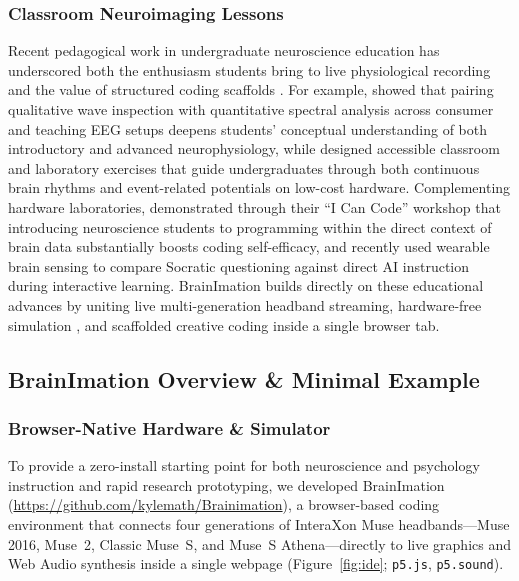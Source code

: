 \documentclass[11pt]{article}
\begin{document}
\subsubsection{Classroom Neuroimaging Lessons}
Recent pedagogical work in undergraduate neuroscience education has underscored both the enthusiasm students bring to live physiological recording and the value of structured coding scaffolds \citep{janssen2021opportunities,hatton2023quantitative,smith2024lowcost,iemi2026icancode}. For example, \citet{hatton2023quantitative} showed that pairing qualitative wave inspection with quantitative spectral analysis across consumer and teaching EEG setups deepens students' conceptual understanding of both introductory and advanced neurophysiology, while \citet{smith2024lowcost} designed accessible classroom and laboratory exercises that guide undergraduates through both continuous brain rhythms and event-related potentials on low-cost hardware. Complementing hardware laboratories, \citet{iemi2026icancode} demonstrated through their ``I Can Code'' workshop that introducing neuroscience students to programming within the direct context of brain data substantially boosts coding self-efficacy, and \citet{clindeffarges2026socrates} recently used wearable brain sensing to compare Socratic questioning against direct AI instruction during interactive learning. BrainImation builds directly on these educational advances by uniting live multi-generation headband streaming, hardware-free simulation \citep{deleeuw2023simulating}, and scaffolded creative coding inside a single browser tab.

\subsection{BrainImation Overview \& Minimal Example}

\subsubsection{Browser-Native Hardware \& Simulator}
To provide a zero-install starting point for both neuroscience and psychology instruction and rapid research prototyping, we developed BrainImation (\url{https://github.com/kylemath/Brainimation}), a browser-based coding environment that connects four generations of InteraXon Muse headbands---Muse 2016, Muse~2, Classic Muse~S, and Muse~S Athena---directly to live graphics and Web Audio synthesis inside a single webpage \citep{mccarthy2015p5} (Figure~\ref{fig:ide}; \texttt{p5.js}, \texttt{p5.sound}).
\end{document}
